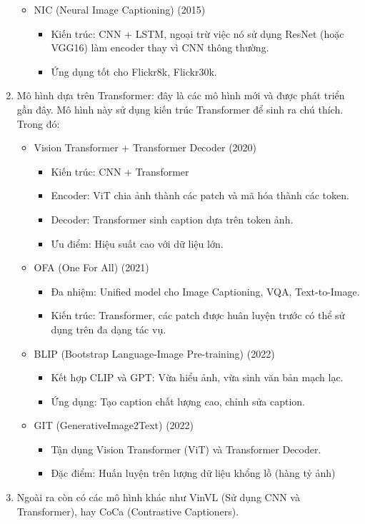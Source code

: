\documentclass[../main.tex]{subfiles}
\begin{document}
\begin{enumerate}
\begin{itemize}
        \item NIC (Neural Image Captioning) (2015)
        \begin{itemize}
            \item Kiến trúc: CNN + LSTM, ngoại trừ việc nó sử dụng ResNet (hoặc VGG16) làm encoder thay vì CNN thông thường.
            \item Ứng dụng tốt cho Flickr8k, Flickr30k.
        \end{itemize}
    \end{itemize}
    \item Mô hình dựa trên Transformer: đây là các mô hình mới và được phát triển gần đây. Mô hình này sử dụng kiến trúc Transformer để sinh ra chú thích. Trong đó:
        \begin{itemize}
            \item Vision Transformer + Transformer Decoder (2020)
            \begin{itemize}
                \item Kiến trúc: CNN + Transformer
                \item Encoder: ViT chia ảnh thành các patch và mã hóa thành các token.
                \item Decoder: Transformer sinh caption dựa trên token ảnh.
                \item Ưu điểm: Hiệu suất cao với dữ liệu lớn.
            \end{itemize}
            \item OFA (One For All) (2021)
            \begin{itemize}
                \item Đa nhiệm: Unified model cho Image Captioning, VQA, Text-to-Image.
                \item Kiến trúc: Transformer, các patch được huân luyện trước có thể sử dụng trên đa dạng tác vụ.
            \end{itemize}
            \item BLIP (Bootstrap Language-Image Pre-training) (2022)
            \begin{itemize}
                \item Kết hợp CLIP và GPT: Vừa hiểu ảnh, vừa sinh văn bản mạch lạc.
                \item Ứng dụng: Tạo caption chất lượng cao, chỉnh sửa caption.
            \end{itemize}
            \item GIT (GenerativeImage2Text) (2022)
            \begin{itemize}
                \item Tận dụng Vision Transformer (ViT) và Transformer Decoder.
                \item Đặc điểm: Huấn luyện trên lượng dữ liệu khổng lồ (hàng tỷ ảnh)
            \end{itemize}
            \end{itemize}
    \item Ngoài ra còn có các mô hình khác như VinVL (Sử dụng CNN và Transformer), hay CoCa (Contrastive Captioners).
\end{enumerate}
\end{document}

